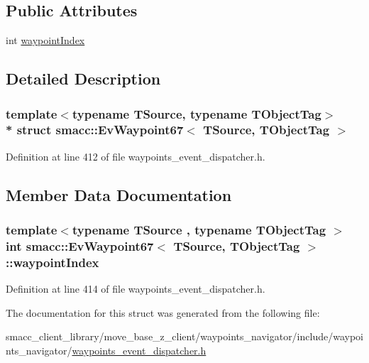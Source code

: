 \subsection*{Public Attributes}
\begin{DoxyCompactItemize}
\item 
int \hyperlink{structsmacc_1_1EvWaypoint67_acab7340aaf0e399789bd7953720ed212}{waypoint\+Index}
\end{DoxyCompactItemize}


\subsection{Detailed Description}
\subsubsection*{template$<$typename T\+Source, typename T\+Object\+Tag$>$\\*
struct smacc\+::\+Ev\+Waypoint67$<$ T\+Source, T\+Object\+Tag $>$}



Definition at line 412 of file waypoints\+\_\+event\+\_\+dispatcher.\+h.



\subsection{Member Data Documentation}
\subsubsection[{\texorpdfstring{waypoint\+Index}{waypointIndex}}]{\setlength{\rightskip}{0pt plus 5cm}template$<$typename T\+Source , typename T\+Object\+Tag $>$ int {\bf smacc\+::\+Ev\+Waypoint67}$<$ T\+Source, T\+Object\+Tag $>$\+::waypoint\+Index}\hypertarget{structsmacc_1_1EvWaypoint67_acab7340aaf0e399789bd7953720ed212}{}\label{structsmacc_1_1EvWaypoint67_acab7340aaf0e399789bd7953720ed212}


Definition at line 414 of file waypoints\+\_\+event\+\_\+dispatcher.\+h.



The documentation for this struct was generated from the following file\+:\begin{DoxyCompactItemize}
\item 
smacc\+\_\+client\+\_\+library/move\+\_\+base\+\_\+z\+\_\+client/waypoints\+\_\+navigator/include/waypoints\+\_\+navigator/\hyperlink{waypoints__event__dispatcher_8h}{waypoints\+\_\+event\+\_\+dispatcher.\+h}\end{DoxyCompactItemize}
